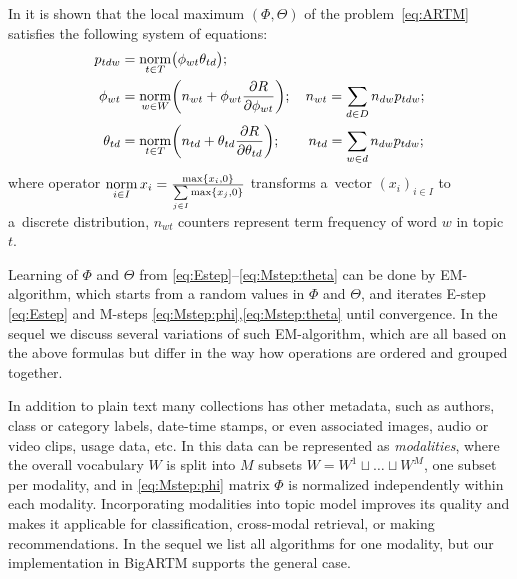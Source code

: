 \documentclass[russian,english]{llncs}
\newcommand{\norm}{\mathop{\rm norm}\limits}
\begin{document}
In \cite{voron14dan-eng} it is shown that the \mbox{local} maximum $(\Phi,\Theta)$
of the problem~\eqref{eq:ARTM} satisfies
the following system of equations:
\begin{align}
    \label{eq:Estep}
    p_{tdw} &= \norm_{t\in T} \bigl(\phi_{wt}\theta_{td}\bigr);
\\
    \label{eq:Mstep:phi}
    \phi_{wt} &= \norm_{w\in W}
        \biggl(
            n_{wt} + \phi_{wt} \frac{\partial R}{\partial \phi_{wt}}
        \biggr);
        \quad
            n_{wt} = \sum_{d\in D} n_{dw} p_{tdw};
\\
    \label{eq:Mstep:theta}
    \theta_{td} &= \norm_{t\in T}
        \biggl(
            n_{td} + \theta_{td} \frac{\partial R}{\partial \theta_{td}}
        \biggr);
        \quad\quad
            n_{td} = \sum_{w\in d} n_{dw} p_{tdw};
\end{align}
where operator
$\norm_{i \in I} x_i = \frac{\max\{x_i,0\}}{\sum\limits_{j\in I} \max\{x_j,0\}}$
transforms a~vector $(x_i)_{i \in I}$ to a~discrete distribution,
$n_{wt}$ counters represent term frequency of word $w$ in topic $t$.

Learning of $\Phi$ and $\Theta$ from \eqref{eq:Estep}--\eqref{eq:Mstep:theta} can be done by EM-algorithm,
which starts from a random values in $\Phi$ and $\Theta$, and iterates
E-step \eqref{eq:Estep} and
M-steps \eqref{eq:Mstep:phi},\eqref{eq:Mstep:theta}
until convergence.
In the sequel we discuss several variations of such EM-algorithm,
which are all based on the above formulas but differ in the way how operations are ordered and grouped together.

In addition to plain text many collections has other metadata,
such as authors, class or category labels, date-time stamps,
or even associated images, audio or video clips, usage data, etc.
In \cite{voron15nonbayesian} this data can be represented as \emph{modalities},
where the overall vocabulary $W$ is split into $M$ subsets
$W = W^1 \sqcup \dots \sqcup W^M$, one subset per modality,
and in \eqref{eq:Mstep:phi} matrix $\Phi$ is normalized independently 
within each modality.
Incorporating modalities into topic model improves its quality
and makes it applicable for classification, cross-modal retrieval, or making recommendations.
In the sequel we list all algorithms for one modality,
but our implementation in BigARTM supports the general case.
\end{document}
